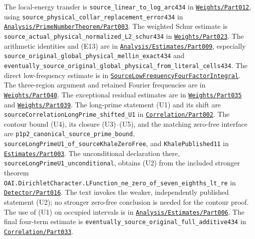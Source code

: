 The local-energy transfer is
{\small\nolinkurl{source_linear_to_log_arc434}} in
\href{../Green64/Library/Weights/Part012.lean}{\nolinkurl{Weights/Part012}},
using {\small\nolinkurl{source_physical_collar_replacement_error434}} in
\href{../Green64/Library/Analysis/PrimeNumberTheorem/Part003.lean}{\nolinkurl{Analysis/PrimeNumberTheorem/Part003}}.
The weighted Schur estimate is
{\small\nolinkurl{source_actual_physical_normalized_L2_schur434}} in
\href{../Green64/Library/Weights/Part023.lean}{\nolinkurl{Weights/Part023}}.
The arithmetic identities and (E13) are in
\href{../Green64/Library/Analysis/Estimates/Part009.lean}{\nolinkurl{Analysis/Estimates/Part009}},
especially
{\small\nolinkurl{source_original_global_physical_mellin_exact434}} and
{\small\nolinkurl{eventually_source_original_global_physical_from_literal_cells434}}.
The direct low-frequency estimate is in
\href{../Green64/Library/Analysis/Estimates/SourceLowFrequencyFourFactorIntegral.lean}{\nolinkurl{SourceLowFrequencyFourFactorIntegral}}.
The three-region argument and retained Fourier frequencies are in
\href{../Green64/Library/Weights/Part040.lean}{\nolinkurl{Weights/Part040}}.
The exceptional residual estimates are in
\href{../Green64/Library/Weights/Part035.lean}{\nolinkurl{Weights/Part035}}
and
\href{../Green64/Library/Weights/Part039.lean}{\nolinkurl{Weights/Part039}}.
The long-prime statement (U1) and its shift are
{\small\nolinkurl{sourceCorrelationLongPrime_shifted_U1}} in
\href{../Green64/Library/Correlation/Part002.lean}{\nolinkurl{Correlation/Part002}}.
The contour bound (U4), its closure (U3)--(U5), and the matching
zero-free interface are
{\small\nolinkurl{p1p2_canonical_source_prime_bound}},
{\small\nolinkurl{sourceLongPrimeU1_of_sourceKhaleZeroFree}}, and
{\small\nolinkurl{KhalePublished11}} in
\href{../Green64/Library/Analysis/Estimates/Part003.lean}{\nolinkurl{Estimates/Part003}}.
The unconditional declaration there,
{\small\nolinkurl{sourceLongPrimeU1_unconditional}}, obtains (U2) from
the included stronger theorem
{\small\nolinkurl{OAI.DirichletCharacter.LFunction_ne_zero_of_seven_eighths_lt_re}}
in
\href{../Green64/Library/Analysis/NumberTheory/DirichletL/Detector/Part016.lean}{\nolinkurl{Detector/Part016}}.
The text invokes the weaker, independently published statement (U2); no
stronger zero-free conclusion is needed for the contour proof. The use
of (U1) on occupied intervals is in
\href{../Green64/Library/Analysis/Estimates/Part006.lean}{\nolinkurl{Analysis/Estimates/Part006}}.
The final four-term estimate is
{\small\nolinkurl{eventually_source_original_full_additive434}} in
\href{../Green64/Library/Correlation/Part033.lean}{\nolinkurl{Correlation/Part033}}.

